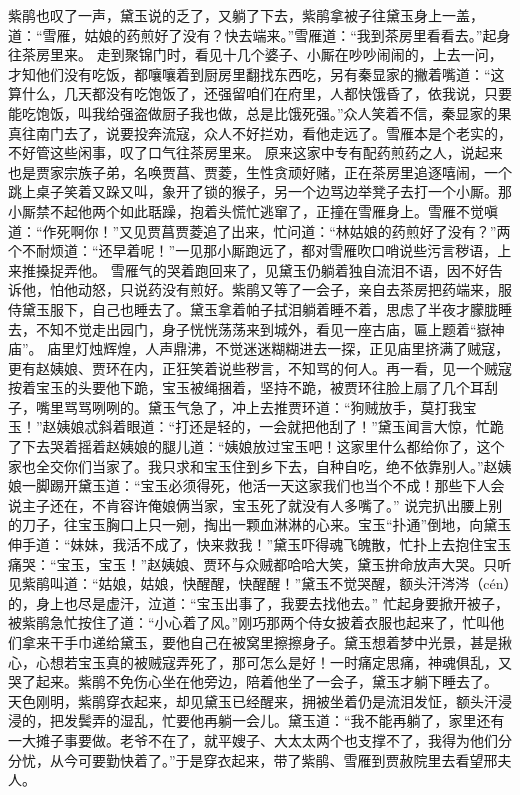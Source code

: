 \documentclass[12pt,oneside]{book}
\begin{document}
紫鹃也叹了一声，黛玉说的乏了，又躺了下去，紫鹃拿被子往黛玉身上一盖，道：“雪雁，姑娘的药煎好了没有？快去端来。”雪雁道：“我到茶房里看看去。”起身往茶房里来。
走到聚锦门时，看见十几个婆子、小厮在吵吵闹闹的，上去一问，才知他们没有吃饭，都嚷嚷着到厨房里翻找东西吃，另有秦显家的撇着嘴道：“这算什么，几天都没有吃饱饭了，还强留咱们在府里，人都快饿昏了，依我说，只要能吃饱饭，叫我给强盗做厨子我也做，总是比饿死强。”众人笑着不信，秦显家的果真往南门去了，说要投奔流寇，众人不好拦劝，看他走远了。雪雁本是个老实的，不好管这些闲事，叹了口气往茶房里来。
原来这家中专有配药煎药之人，说起来也是贾家宗族子弟，名唤贾菖、贾菱，生性贪顽好赌，正在茶房里追逐嘻闹，一个跳上桌子笑着又跺又叫，象开了锁的猴子，另一个边骂边举凳子去打一个小厮。那小厮禁不起他两个如此聒躁，抱着头慌忙逃窜了，正撞在雪雁身上。雪雁不觉嗔道：“作死啊你！”又见贾菖贾菱追了出来，忙问道：“林姑娘的药煎好了没有？”两个不耐烦道：“还早着呢！”一见那小厮跑远了，都对雪雁吹口哨说些污言秽语，上来推搡捉弄他。
雪雁气的哭着跑回来了，见黛玉仍躺着独自流泪不语，因不好告诉他，怕他动怒，只说药没有煎好。紫鹃又等了一会子，亲自去茶房把药端来，服侍黛玉服下，自己也睡去了。黛玉拿着帕子拭泪躺着睡不着，思虑了半夜才朦胧睡去，不知不觉走出园门，身子恍恍荡荡来到城外，看见一座古庙，匾上题着“嶽神庙”。
庙里灯烛辉煌，人声鼎沸，不觉迷迷糊糊进去一探，正见庙里挤满了贼寇，更有赵姨娘、贾环在内，正狂笑着说些秽言，不知骂的何人。再一看，见一个贼寇按着宝玉的头要他下跪，宝玉被绳捆着，坚持不跪，被贾环往脸上扇了几个耳刮子，嘴里骂骂咧咧的。黛玉气急了，冲上去推贾环道：“狗贼放手，莫打我宝玉！”赵姨娘忒斜着眼道：“打还是轻的，一会就把他刮了！”黛玉闻言大惊，忙跪了下去哭着摇着赵姨娘的腿儿道：“姨娘放过宝玉吧！这家里什么都给你了，这个家也全交你们当家了。我只求和宝玉住到乡下去，自种自吃，绝不依靠别人。”赵姨娘一脚踢开黛玉道：“宝玉必须得死，他活一天这家我们也当个不成！那些下人会说主子还在，不肯容许俺娘俩当家，宝玉死了就没有人多嘴了。”
说完扒出腰上别的刀子，往宝玉胸口上只一剜，掏出一颗血淋淋的心来。宝玉“扑通”倒地，向黛玉伸手道：“妹妹，我活不成了，快来救我！”黛玉吓得魂飞魄散，忙扑上去抱住宝玉痛哭：“宝玉，宝玉！”赵姨娘、贾环与众贼都哈哈大笑，黛玉拚命放声大哭。只听见紫鹃叫道：“姑娘，姑娘，快醒醒，快醒醒！”黛玉不觉哭醒，额头汗涔涔（cén）的，身上也尽是虚汗，泣道：“宝玉出事了，我要去找他去。”
忙起身要掀开被子，被紫鹃急忙按住了道：“小心着了风。”刚巧那两个侍女披着衣服也起来了，忙叫他们拿来干手巾递给黛玉，要他自己在被窝里擦擦身子。黛玉想着梦中光景，甚是揪心，心想若宝玉真的被贼寇弄死了，那可怎么是好！一时痛定思痛，神魂俱乱，又哭了起来。紫鹃不免伤心坐在他旁边，陪着他坐了一会子，黛玉才躺下睡去了。
天色刚明，紫鹃穿衣起来，却见黛玉已经醒来，拥被坐着仍是流泪发怔，额头汗浸浸的，把发鬓弄的湿乱，忙要他再躺一会儿。黛玉道：“我不能再躺了，家里还有一大摊子事要做。老爷不在了，就平嫂子、大太太两个也支撑不了，我得为他们分分忧，从今可要勤快着了。”于是穿衣起来，带了紫鹃、雪雁到贾赦院里去看望邢夫人。
\end{document}
